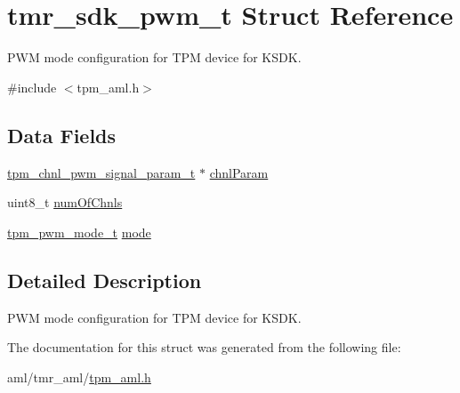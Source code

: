\hypertarget{structtmr__sdk__pwm__t}{}\section{tmr\+\_\+sdk\+\_\+pwm\+\_\+t Struct Reference}
\label{structtmr__sdk__pwm__t}


P\+WM mode configuration for T\+PM device for K\+S\+DK.  




{\ttfamily \#include $<$tpm\+\_\+aml.\+h$>$}

\subsection*{Data Fields}
\begin{DoxyCompactItemize}
\item 
\mbox{\hyperlink{group__tpm_ga19383e0a3baf4033a37e96df9016ab1c}{tpm\+\_\+chnl\+\_\+pwm\+\_\+signal\+\_\+param\+\_\+t}} $\ast$ \mbox{\hyperlink{group__struct__group_ga7a88598e04539adadd8553ef53cbc240}{chnl\+Param}}
\item 
uint8\+\_\+t \mbox{\hyperlink{group__struct__group_ga04fc2b7b992637ebdbf5567107730087}{num\+Of\+Chnls}}
\item 
\mbox{\hyperlink{group__tpm_ga3575f319c9fbc1aa574a1054c14e7dab}{tpm\+\_\+pwm\+\_\+mode\+\_\+t}} \mbox{\hyperlink{group__struct__group_ga4c09362008685312f26edfb50458aad6}{mode}}
\end{DoxyCompactItemize}


\subsection{Detailed Description}
P\+WM mode configuration for T\+PM device for K\+S\+DK. 

The documentation for this struct was generated from the following file\+:\begin{DoxyCompactItemize}
\item 
aml/tmr\+\_\+aml/\mbox{\hyperlink{tpm__aml_8h}{tpm\+\_\+aml.\+h}}\end{DoxyCompactItemize}
